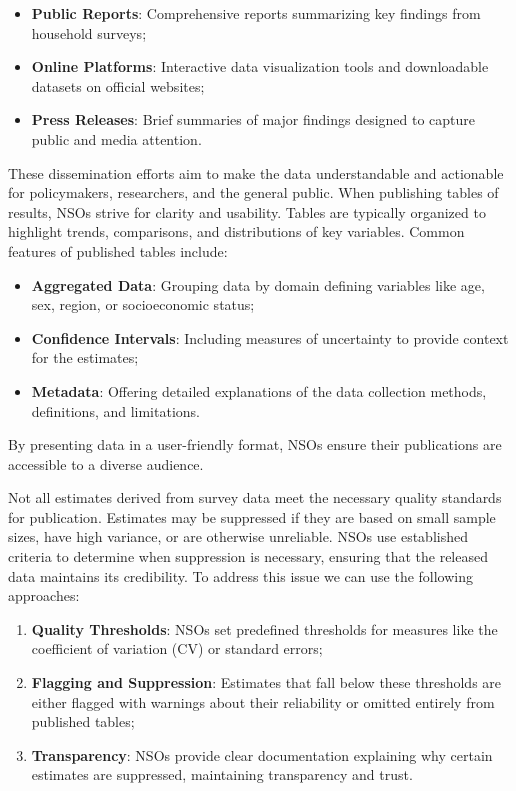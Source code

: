 \documentclass[
  12pt,
]{book}
\begin{document}
\begin{itemize}
\item
  \textbf{Public Reports}: Comprehensive reports summarizing key findings from household surveys;
\item
  \textbf{Online Platforms}: Interactive data visualization tools and downloadable datasets on official websites;
\item
  \textbf{Press Releases}: Brief summaries of major findings designed to capture public and media attention.
\end{itemize}

These dissemination efforts aim to make the data understandable and actionable for policymakers, researchers, and the general public. When publishing tables of results, NSOs strive for clarity and usability. Tables are typically organized to highlight trends, comparisons, and distributions of key variables. Common features of published tables include:

\begin{itemize}
\item
  \textbf{Aggregated Data}: Grouping data by domain defining variables like age, sex, region, or socioeconomic status;
\item
  \textbf{Confidence Intervals}: Including measures of uncertainty to provide context for the estimates;
\item
  \textbf{Metadata}: Offering detailed explanations of the data collection methods, definitions, and limitations.
\end{itemize}

By presenting data in a user-friendly format, NSOs ensure their publications are accessible to a diverse audience.

Not all estimates derived from survey data meet the necessary quality standards for publication. Estimates may be suppressed if they are based on small sample sizes, have high variance, or are otherwise unreliable. NSOs use established criteria to determine when suppression is necessary, ensuring that the released data maintains its credibility. To address this issue we can use the following approaches:

\begin{enumerate}
\def\labelenumi{\arabic{enumi}.}
\item
  \textbf{Quality Thresholds}: NSOs set predefined thresholds for measures like the coefficient of variation (CV) or standard errors;
\item
  \textbf{Flagging and Suppression}: Estimates that fall below these thresholds are either flagged with warnings about their reliability or omitted entirely from published tables;
\item
  \textbf{Transparency}: NSOs provide clear documentation explaining why certain estimates are suppressed, maintaining transparency and trust.
\end{enumerate}
\end{document}
